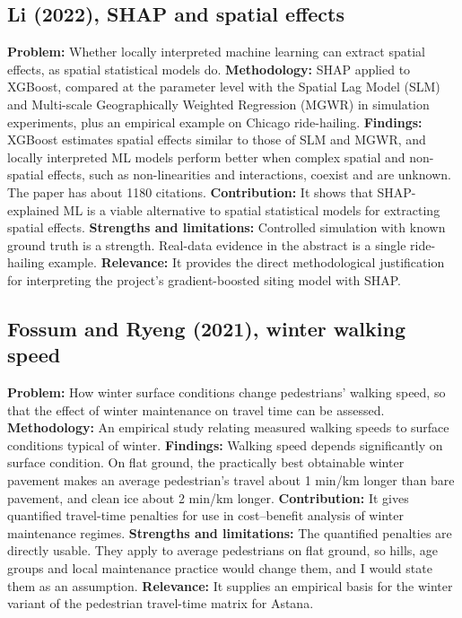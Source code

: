 \documentclass[journal]{IEEEtran}
\begin{document}
\subsection{Li (2022), SHAP and spatial effects \cite{li2022}}
\textbf{Problem:} Whether locally interpreted machine learning can extract spatial effects, as spatial statistical models do.
\textbf{Methodology:} SHAP applied to XGBoost, compared at the parameter level with the Spatial Lag Model (SLM) and Multi-scale Geographically Weighted Regression (MGWR) in simulation experiments, plus an empirical example on Chicago ride-hailing.
\textbf{Findings:} XGBoost estimates spatial effects similar to those of SLM and MGWR, and locally interpreted ML models perform better when complex spatial and non-spatial effects, such as non-linearities and interactions, coexist and are unknown. The paper has about 1180 citations.
\textbf{Contribution:} It shows that SHAP-explained ML is a viable alternative to spatial statistical models for extracting spatial effects.
\textbf{Strengths and limitations:} Controlled simulation with known ground truth is a strength. Real-data evidence in the abstract is a single ride-hailing example.
\textbf{Relevance:} It provides the direct methodological justification for interpreting the project's gradient-boosted siting model with SHAP.

\subsection{Fossum and Ryeng (2021), winter walking speed \cite{winterwalk2021}}
\textbf{Problem:} How winter surface conditions change pedestrians' walking speed, so that the effect of winter maintenance on travel time can be assessed.
\textbf{Methodology:} An empirical study relating measured walking speeds to surface conditions typical of winter.
\textbf{Findings:} Walking speed depends significantly on surface condition. On flat ground, the practically best obtainable winter pavement makes an average pedestrian's travel about 1 min/km longer than bare pavement, and clean ice about 2 min/km longer.
\textbf{Contribution:} It gives quantified travel-time penalties for use in cost--benefit analysis of winter maintenance regimes.
\textbf{Strengths and limitations:} The quantified penalties are directly usable. They apply to average pedestrians on flat ground, so hills, age groups and local maintenance practice would change them, and I would state them as an assumption.
\textbf{Relevance:} It supplies an empirical basis for the winter variant of the pedestrian travel-time matrix for Astana.
\end{document}
